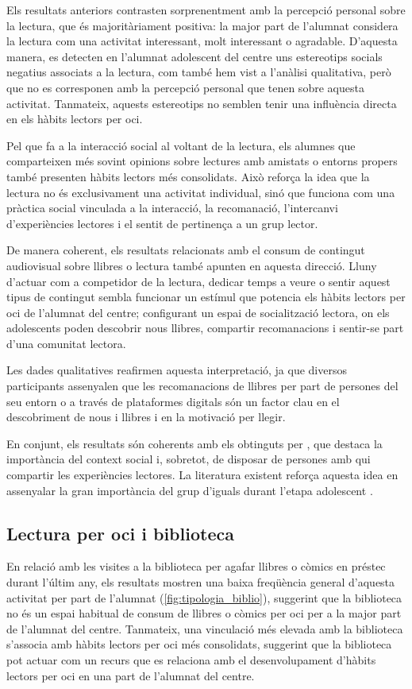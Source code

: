 \documentclass[12pt]{article}
\begin{document}
Els resultats anteriors contrasten sorprenentment amb la percepció personal sobre la lectura, que és majoritàriament positiva: la major part de l'alumnat considera la lectura com una activitat interessant, molt interessant o agradable. D'aquesta manera, es detecten en l'alumnat adolescent del centre uns estereotips socials negatius associats a la lectura, com també hem vist a l'anàlisi qualitativa, però que no es corresponen amb la percepció personal que tenen sobre aquesta activitat. Tanmateix, aquests estereotips no semblen tenir una influència directa en els hàbits lectors per oci.

Pel que fa a la interacció social al voltant de la lectura, els alumnes que comparteixen més sovint opinions sobre lectures amb amistats o entorns propers també presenten hàbits lectors més consolidats. Això reforça la idea que la lectura no és exclusivament una activitat individual, sinó que funciona com una pràctica social vinculada a la interacció, la recomanació, l’intercanvi d’experiències lectores i el sentit de pertinença a un grup lector.

De manera coherent, els resultats relacionats amb el consum de contingut audiovisual sobre llibres o lectura també apunten en aquesta direcció. Lluny d’actuar com a competidor de la lectura, dedicar temps a veure o sentir aquest tipus de contingut sembla funcionar un estímul que potencia els hàbits lectors per oci de l'alumnat del centre; configurant un espai de socialització lectora, on els adolescents poden descobrir nous llibres, compartir recomanacions i sentir-se part d’una comunitat lectora.

Les dades qualitatives reafirmen aquesta interpretació, ja que diversos participants assenyalen que les recomanacions de llibres per part de persones del seu entorn o a través de plataformes digitals són un factor clau en el descobriment de nous i llibres i en la motivació per llegir.

En conjunt, els resultats són coherents amb els obtinguts per \textcite{shutaleva}, que destaca la importància del context social i, sobretot, de disposar de persones amb qui compartir les experiències lectores. La literatura existent reforça aquesta idea en assenyalar la gran importància del grup d’iguals durant l’etapa adolescent \parencite{berger}.

\subsection{Lectura per oci i biblioteca}
En relació amb les visites a la biblioteca per agafar llibres o còmics en préstec durant l’últim any, els resultats mostren una baixa freqüència general d’aquesta activitat per part de l’alumnat (\autoref{fig:tipologia_biblio}), suggerint que la biblioteca no és un espai habitual de consum de llibres o còmics per oci per a la major part de l’alumnat del centre. Tanmateix, una vinculació més elevada amb la biblioteca s’associa amb hàbits lectors per oci més consolidats, suggerint que la biblioteca pot actuar com un recurs que es relaciona amb el desenvolupament d’hàbits lectors per oci en una part de l’alumnat del centre.
\end{document}
